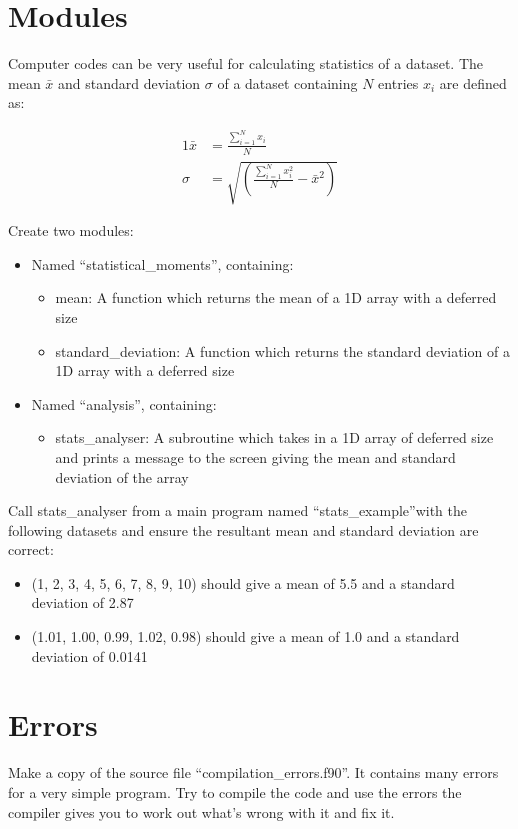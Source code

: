 \documentclass[11pt,a4paper]{article}
\begin{document}
\section{Modules}
Computer codes can be very useful for calculating statistics of a dataset. The mean $\bar{x}$ and standard deviation $\sigma$ of a dataset containing $N$ entries $x_{i}$ are defined as:

\begin{alignat}{1}
    \bar{x} & = \frac{\sum\limits_{i=1}^{N} x_{i}}{N} \\
    \sigma &= \sqrt{\left(\frac{\sum\limits_{i=1}^{N} x_{i}^{2}}{N}-\bar{x}^{2}\right)}
\end{alignat}

Create two modules:
\begin{itemize}
    \item Named ``statistical\_moments'', containing:
    \begin{itemize}
        \item mean: A function which returns the mean of a 1D array with a deferred size
        \item standard\_deviation: A function which returns the standard deviation of a 1D array with a deferred size
    \end{itemize}
    \item Named ``analysis'', containing:
    \begin{itemize}
        \item stats\_analyser: A subroutine which takes in a 1D array of deferred size and prints a message to the screen giving the mean and standard deviation of the array
    \end{itemize}
\end{itemize}

Call stats\_analyser from a main program named ``stats\_example''with the following datasets and ensure the resultant mean and standard deviation are correct:
\begin{itemize}
    \item (1, 2, 3, 4, 5, 6, 7, 8, 9, 10) should give a mean of 5.5 and a standard deviation of 2.87
    \item (1.01, 1.00, 0.99, 1.02, 0.98) should give a mean of 1.0 and a standard deviation of  0.0141
\end{itemize}

\section{Errors}
Make a copy of the source file ``compilation\_errors.f90''. It contains many errors for a very simple program. Try to compile the code and use the errors the compiler gives you to work out what's wrong with it and fix it.
\end{document}
